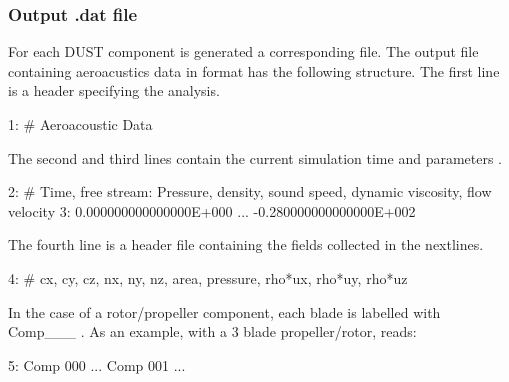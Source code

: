 \subsubsection{Output .dat file}
For each DUST component is generated a corresponding  file.
The output file containing aeroacustics data in  format has 
the following structure. The first line is a header specifying the 
analysis.
\begin{inputfile}[frame=single]
  1: # Aeroacoustic Data
\end{inputfile}
The second and third lines contain the current simulation time and parameters .  
\begin{inputfile}[frame=single]
  2: # Time, free stream: Pressure, density, sound speed, dynamic viscosity, flow velocity 
  3: 0.000000000000000E+000   ... -0.280000000000000E+002
\end{inputfile}
The fourth line is a header file containing the fields collected in the nextlines.
\begin{inputfile}[frame=single]
  4: # cx, cy, cz, nx, ny, nz, area, pressure, rho*ux, rho*uy, rho*uz
\end{inputfile}
In the case of a rotor/propeller component, each blade is labelled with Comp___ .
As an example, with a 3 blade propeller/rotor, reads:
\begin{inputfile}[frame=single]
  5: Comp 000
      ...
     Comp 001
      ...
\end{inputfile}
